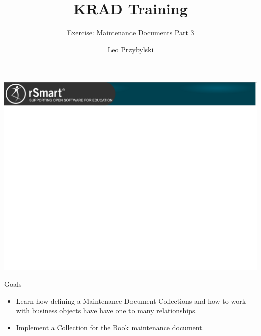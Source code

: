 \documentclass[xcolor=dvipsnames,14pt,professionalfonts]{beamer}
\begin{document}
\title{KRAD Training}
\subtitle{Exercise: Maintenance Documents Part 3}
\author[Leo]{Leo Przybylski}

\usebackgroundtemplate%
{%
    \includegraphics[width=\paperwidth,height=\paperheight]{../img/header.png}%
}

{
}

\begin{frame}{Goals}
  \begin{itemize}
 \item Learn how defining a Maintenance Document Collections and how
   to work with business objects have have one to many relationships.
 \item Implement a Collection for the Book maintenance document.
\end{itemize}
\end{frame}
\end{document}
